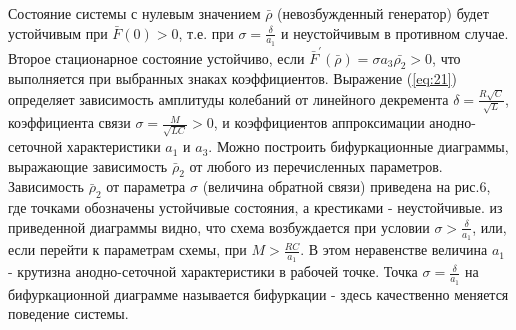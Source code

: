 Состояние системы с нулевым значением $\bar{\rho}$ (невозбужденный генератор) будет устойчивым при $\bar{F}(0)>0$, т.е. при $\sigma=\frac{\delta}{a_1}$ и неустойчивым в противном случае. Второе стационарное состояние устойчиво, если $\bar{F}^{'}(\bar{\rho})=\sigma a_3 \bar{\rho_2}>0$, что выполняется при выбранных знаках коэффициентов. Выражение (\ref{eq:21}) определяет зависимость амплитуды колебаний от линейного декремента $\delta=\frac{R\sqrt{C}}{\sqrt{L}}$, коэффициента связи $\sigma=\frac{M}{\sqrt{LC}}>0$, и коэффициентов аппроксимации анодно-сеточной характеристики $a_1$ и $a_3$. Можно построить бифуркационные диаграммы, выражающие зависимость $\bar{\rho}_2$ от любого из перечисленных параметров. Зависимость $\bar{\rho}_2$ от параметра $\sigma$ (величина обратной связи) приведена на рис.6, где точками обозначены устойчивые состояния, а крестиками - неустойчивые. из приведенной диаграммы видно, что схема возбуждается при условии $\sigma>\frac{\delta}{a_1}$, или, если перейти к параметрам схемы, при $M>\frac{RC}{a_1}$. В этом неравенстве величина $a_1$ - крутизна анодно-сеточной характеристики в рабочей точке. Точка $\sigma=\frac{\delta}{a_1}$ на бифуркационной диаграмме называется { бифуркации} - здесь качественно меняется поведение системы.
